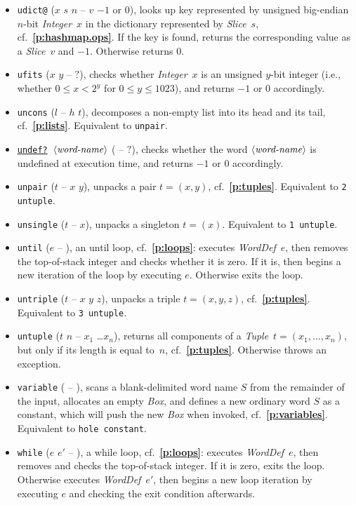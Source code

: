 \documentclass[12pt,oneside]{article}
\def\refpoint#1{{\rm\textbf{\ref{#1}}}}
\let\ptref=\refpoint
\begin{document}
\begin{itemize}
\item {\tt udict@} ($x$ $s$ $n$ -- $v$ $-1$ or $0$), looks up key represented by unsigned big-endian $n$-bit {\em Integer\/}~$x$ in the dictionary represented by {\em Slice\/}~$s$, cf.~\ptref{p:hashmap.ops}. If the key is found, returns the corresponding value as a {\em Slice\/}~$v$ and $-1$. Otherwise returns $0$.
\item {\tt ufits} ($x$ $y$ -- $?$), checks whether {\em Integer\/}~$x$ is an unsigned $y$-bit integer (i.e., whether $0\leq x<2^y$ for $0\leq y\leq 1023$), and returns $-1$ or $0$ accordingly.
\item {\tt uncons} ($l$ -- $h$ $t$), decomposes a non-empty list into its head and its tail, cf.~\ptref{p:lists}. Equivalent to {\tt unpair}.
\item {\tt \underline{undef?} $\langle\textit{word-name\/}\rangle$} ( -- $?$), checks whether the word $\langle\textit{word-name\/}\rangle$ is undefined at execution time, and returns $-1$ or $0$ accordingly.
\item {\tt unpair} ($t$ -- $x$ $y$), unpacks a pair $t=(x,y)$, cf.~\ptref{p:tuples}. Equivalent to {\tt 2 untuple}.
\item {\tt unsingle} ($t$ -- $x$), unpacks a singleton $t=(x)$. Equivalent to {\tt 1 untuple}.
\item {\tt until} ($e$ -- ), an until loop, cf.~\ptref{p:loops}: executes {\em WordDef\/}~$e$, then removes the top-of-stack integer and checks whether it is zero. If it is, then begins a new iteration of the loop by executing $e$. Otherwise exits the loop.
\item {\tt untriple} ($t$ -- $x$ $y$ $z$), unpacks a triple $t=(x,y,z)$, cf.~\ptref{p:tuples}. Equivalent to {\tt 3 untuple}.
\item {\tt untuple} ($t$ $n$ -- $x_1$ \dots $x_n$), returns all components of a {\em Tuple\/}~$t=(x_1,\ldots,x_n)$, but only if its length is equal to~$n$, cf.~\ptref{p:tuples}. Otherwise throws an exception.
\item {\tt variable} ( -- ), scans a blank-delimited word name $S$ from the remainder of the input, allocates an empty {\em Box}, and defines a new ordinary word $S$ as a constant, which will push the new {\em Box\/} when invoked, cf.~\ptref{p:variables}. Equivalent to {\tt hole constant}.
\item {\tt while} ($e$ $e'$ -- ), a while loop, cf.~\ptref{p:loops}: executes {\em WordDef\/}~$e$, then removes and checks the top-of-stack integer. If it is zero, exits the loop. Otherwise executes {\em WordDef\/}~$e'$, then begins a new loop iteration by executing $e$ and checking the exit condition afterwards.

\end{itemize}
\end{document}
